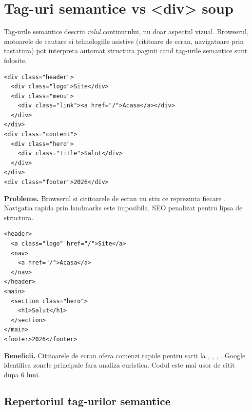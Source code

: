 \section{Tag-uri semantice vs <div> soup}

Tag-urile semantice descriu \emph{rolul} continutului, nu doar aspectul vizual. Browserul, motoarele de cautare si tehnologiile asistive (cititoare de ecran, navigatoare prin tastatura) pot interpreta automat structura paginii cand tag-urile semantice sunt folosite.

\begin{dano}
\begin{lstlisting}[style=html, numbers=none]
<div class="header">
  <div class="logo">Site</div>
  <div class="menu">
    <div class="link"><a href="/">Acasa</a></div>
  </div>
</div>
<div class="content">
  <div class="hero">
    <div class="title">Salut</div>
  </div>
</div>
<div class="footer">2026</div>
\end{lstlisting}
\textbf{Probleme.} Browserul si cititoarele de ecran nu stiu ce reprezinta fiecare . Navigatia rapida prin landmarks este imposibila. SEO penalizat pentru lipsa de structura.
\end{dano}

\begin{dado}
\begin{lstlisting}[style=html, numbers=none]
<header>
  <a class="logo" href="/">Site</a>
  <nav>
    <a href="/">Acasa</a>
  </nav>
</header>
<main>
  <section class="hero">
    <h1>Salut</h1>
  </section>
</main>
<footer>2026</footer>
\end{lstlisting}
\textbf{Beneficii.} Cititoarele de ecran ofera comenzi rapide pentru sarit la , , , . Google identifica zonele principale fara analiza euristica. Codul este mai usor de citit dupa 6 luni.
\end{dado}

\subsection{Repertoriul tag-urilor semantice}

